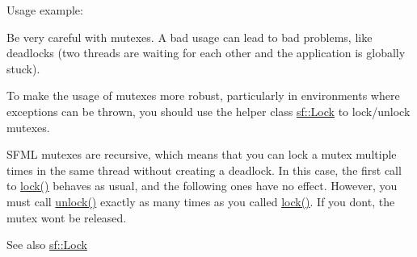 Usage example\+: 
\begin{DoxyCode}{0}
\DoxyCodeLine{}
\DoxyCodeLine{\{}
\DoxyCodeLine{\}}
\DoxyCodeLine{}
\DoxyCodeLine{\{}
\DoxyCodeLine{\}}
\end{DoxyCode}


Be very careful with mutexes. A bad usage can lead to bad problems, like deadlocks (two threads are waiting for each other and the application is globally stuck).

To make the usage of mutexes more robust, particularly in environments where exceptions can be thrown, you should use the helper class \mbox{\hyperlink{classsf_1_1_lock}{sf\+::\+Lock}} to lock/unlock mutexes.

S\+F\+ML mutexes are recursive, which means that you can lock a mutex multiple times in the same thread without creating a deadlock. In this case, the first call to \mbox{\hyperlink{classsf_1_1_mutex_a1a16956a6bbea764480c1b80f2e45763}{lock()}} behaves as usual, and the following ones have no effect. However, you must call \mbox{\hyperlink{classsf_1_1_mutex_ade71268ffc5e80756652058b01c23c33}{unlock()}} exactly as many times as you called \mbox{\hyperlink{classsf_1_1_mutex_a1a16956a6bbea764480c1b80f2e45763}{lock()}}. If you don\textquotesingle{}t, the mutex won\textquotesingle{}t be released.

\begin{DoxySeeAlso}{See also}
\mbox{\hyperlink{classsf_1_1_lock}{sf\+::\+Lock}} \begin{DoxyVerb}\end{DoxyVerb}
 
\end{DoxySeeAlso}


